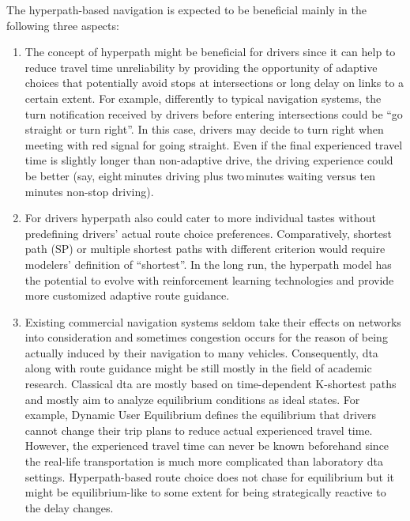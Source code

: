 The hyperpath-based navigation is expected to be beneficial mainly in the following three aspects: 
\begin{enumerate}
\item The concept of hyperpath might be beneficial for drivers since it can help to reduce travel time unreliability by providing the opportunity of adaptive choices that potentially avoid stops at intersections or long delay on links to a certain extent. For example, differently to typical navigation systems, the turn notification received by drivers before entering intersections could be ``go straight or turn right''. In this case, drivers may decide to turn right when meeting with red signal for going straight. Even if the final experienced travel time is slightly longer than non-adaptive drive, the driving experience could be better (say, eight\,minutes driving plus two\,minutes waiting versus ten\,minutes non-stop driving).
\item For drivers hyperpath also could cater to more individual tastes without predefining drivers' actual route choice preferences. Comparatively, shortest path (SP) or multiple shortest paths with different criterion would require modelers' definition of ``shortest''. In the long run, the hyperpath model has the potential to evolve with reinforcement learning technologies and provide more customized adaptive route guidance.
\item Existing commercial navigation systems seldom take their effects on networks into consideration and sometimes congestion occurs for the reason of being actually induced by their navigation to many vehicles. Consequently, \gls{dta} along with route guidance might be still mostly in the field of academic research. Classical \gls{dta} are mostly based on time-dependent K-shortest paths and mostly aim to analyze equilibrium conditions as ideal states. For example, Dynamic User Equilibrium defines the equilibrium that drivers cannot change their trip plans to reduce actual experienced travel time. However, the experienced travel time can never be known beforehand since the real-life transportation is much more complicated than laboratory \gls{dta} settings. Hyperpath-based route choice does not chase for equilibrium but it might be equilibrium-like to some extent for being strategically reactive to the delay changes. 
\end{enumerate}

